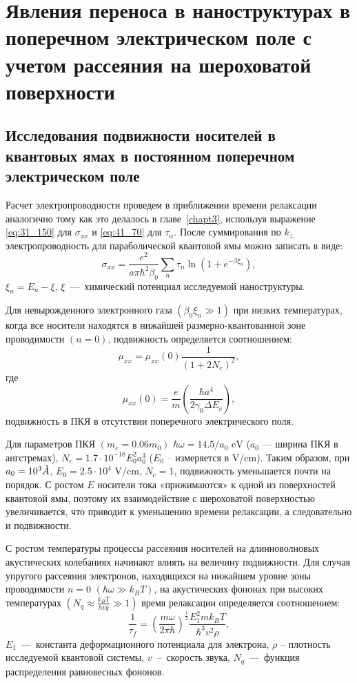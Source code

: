 \chapter{Явления переноса в наноструктурах в поперечном электрическом поле с учетом рассеяния на шероховатой поверхности} \label{chapt4}

\section{Исследования подвижности носителей в квантовых ямах в постоянном поперечном электрическом поле} \label{sect4_1}

Расчет электропроводности проведем в приближении времени релаксации аналогично тому как это делалось в главе~\ref{chapt3}, используя выражение \eqref{eq:31_150} для $\sigma_{xx}$ и \eqref{eq:41_70} для $\tau_{\alpha}$. 
После суммирования по $k_{\bot } $ электропроводность для параболической квантовой ямы можно записать в виде:
\begin{equation} \label{eq:41_80}
\sigma_{xx} =\frac{e^2 }{a\pi \hbar^2 \beta_0 } \sum_n\tau_n \ln \left(1+e^{-\beta \xi_n } \right),
\end{equation}
$\xi_n =E_n -\xi$, $\xi $~---~химический потенциал исследуемой наноструктуры.

Для невырожденного электронного газа $(\beta_0 \xi_n \gg 1)$ при низких температурах, когда все носители находятся в нижайшей размерно-квантованной зоне проводимости $(n=0)$, подвижность определяется соотношением:
\begin{equation} \label{eq:41_90}
\mu_{xx} =\mu_{xx}(0)\frac{1}{\left(1+2 N_c \right)^2 } , 
\end{equation}
где
\[
\mu_{xx}(0)=\frac{e}{m} \left(\frac{\hbar a^4 }{2\gamma_0 \Delta E_c } \right),
\] 
подвижность в ПКЯ в отсутствии поперечного электрического поля.
 
Для параметров ПКЯ $(m_e = 0.06 m_0 )$ $\hbar \omega = 14.5/a_0 \text{ eV}$ ($a_0 $ --- ширина ПКЯ в ангстремах), $N_c =1.7\cdot 10^{-18} E_0^2 a_0^3 $ ($E_0 $ -- измеряется в V/cm). Таким образом, при $a_0 = 10^3 \AA$, $E_0 = 2.5\cdot 10^4 \text{ V/cm}$, $N_c =1$, подвижность уменьшается почти на порядок. С ростом $E$ носители тока «прижимаются» к одной из поверхностей квантовой ямы, поэтому их взаимодействие с шероховатой поверхностью увеличивается, что приводит к уменьшению времени релаксации, а следовательно и подвижности.

С ростом температуры процессы рассеяния носителей на длинноволновых акустических колебаниях начинают влиять на величину подвижности. Для случая упругого рассеяния электронов, находящихся на нижайшем уровне зоны проводимости $n=0$ $(\hbar \omega \gg k_B T)$, на акустических фононах при высоких температурах $(N_q \approx \frac{k_BT}{hvq} \gg 1)$ время релаксации определяется соотношением:
\begin{equation} \label{eq:41_100}
\frac{1}{\tau _{f} } =\left(\frac{m\omega }{2\pi \hbar } \right)^{\frac{1}{2} } \frac{E_1^2 m k_B T}{\hbar^3 v^2 \rho } , 
\end{equation} 
$E_1 $~---~константа деформационного потенциала для электрона, $\rho $ -- плотность исследуемой квантовой системы, $v$~--~скорость звука, $N_q $~---~функция распределения равновесных фононов.

